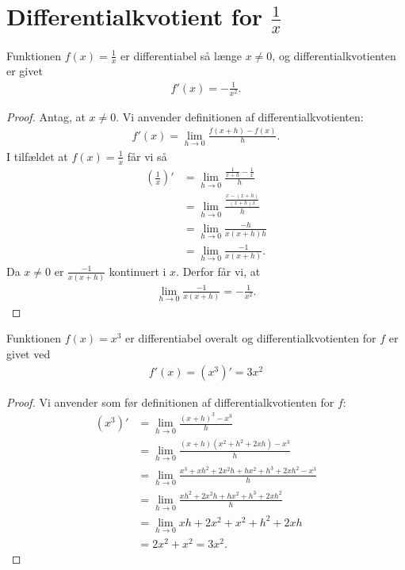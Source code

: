 \section*{Differentialkvotient for $\frac{1}{x}$}
\begin{setn}
Funktionen $f(x) = \frac{1}{x}$ er differentiabel så længe $x\neq 0$, og differentialkvotienten er givet
\begin{align*}
f'(x) = -\frac{1}{x^2}.
\end{align*}
\end{setn}
\begin{proof}
Antag, at $x\neq 0$. Vi anvender definitionen af differentialkvotienten:
\begin{align*}
f'(x) = \lim_{h\to 0} \frac{f(x+h)-f(x)}{h}.
\end{align*}
I tilfældet at $f(x) = \frac{1}{x}$ får vi så
\begin{align*}
(\frac{1}{x})' &= \lim_{h\to 0} \frac{\frac{1}{x+h}-\frac{1}{x}}{h}\\
&= \lim_{h\to 0} \frac{\frac{x-(x+h)}{(x+h)x}}{h}\\
&= \lim_{h\to 0} \frac{-h}{x(x+h)h}\\
&= \lim_{h\to 0} \frac{-1}{x(x+h)}.
\end{align*}
Da $x\neq 0$ er $\frac{-1}{x(x+h)}$ kontinuert i $x$. Derfor får vi, at 
\begin{align*}
 \lim_{h\to 0} \frac{-1}{x(x+h)} = -\frac{1}{x^2}.
\end{align*}
\end{proof}
\begin{setn}
Funktionen $f(x) = x^3$ er differentiabel overalt og differentialkvotienten for $f$ er givet ved
\begin{align*}
f'(x) = (x^3)' = 3x^2
\end{align*}
\end{setn}
\begin{proof}
Vi anvender som før definitionen af differentialkvotienten for $f$:
\begin{align*}
(x^3)' &= \lim_{h\to 0}\frac{(x+h)^3-x^3}{h}\\
       &= \lim_{h\to 0}\frac{(x+h)(x^2+h^2+2xh)-x^3}{h}\\
       &= \lim_{h\to 0}\frac{x^3+xh^2+2x^2h+hx^2+h^3+2xh^2-x^3}{h}\\
       &= \lim_{h\to 0}\frac{xh^2+2x^2h+hx^2+h^3+2xh^2}{h}\\
       &= \lim_{h\to 0}xh+2x^2+x^2+h^2+2xh\\
       &= 2x^2+x^2 = 3x^2.
\end{align*}
\end{proof}

